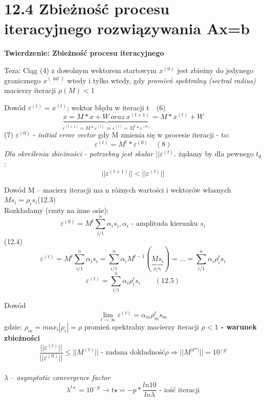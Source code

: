 \section{12.4 Zbieżność procesu iteracyjnego rozwiązywania Ax=b}

\begin{frame}{}
  \textbf{Twierdzenie: Zbieżność procesu iteracyjnego}
  \begin{block}{Teza:}
    \center Ciąg (4) z dowolnym wektorem startowym $x^{(0)}$ jest zbieżny do jedynego granicznego $x^{(\inf)}$ wtedy i tylko wtedy, gdy \emph{promień spektralny (sectral radius)} macierzy iteracji
    \center $\rho(M)<1$
  \end{block}
\end{frame}

\begin{frame}{}
  \begin{block}{Dowód}
    $\varepsilon^{(t)}=x^{(t)}$; wektor błędu w iteracji t$\quad$(6)
    \[\underbrace{x=M*x+W\ oraz\ x^{(t+1)}}_{\varepsilon^{(t+1)}=M*\varepsilon^{(t)} \Rightarrow \varepsilon^{(t)}=M^t*\varepsilon^{(0)}}=M*x^{(t)}+W\]
    (7) $\varepsilon^{(0)}$ - \emph{initial error vector} gdy M zmienia się w procesie iteracji - to:
    \[{\varepsilon}^{(t)}=M^t*{\varepsilon}^{(0)} \quad (8)\]
    \emph{Dla określenia zbieżności - potrzebny jest skalar $||\varepsilon^{(t)}$.}
    żądamy by dla pewnego $t_0$:
    \[||\varepsilon^{(t+1)}||<||\varepsilon^{(t)}||\]
  \end{block}
\end{frame}

\begin{frame}{}
  \begin{block}{Dowód}
    M -- macierz iteracji ma n różnych wartości i wektorów własnych
    \\\hfill$Ms_i=\rho _is_i$\hfill (12.3)
    \\Rozkładamy (rzuty na inne osie):
    \[\varepsilon^{(0)}=M^t \sum_{i/1}^{n} \alpha _i s_i , \alpha _i \text{ - amplituda kierunku } s_i\]
    \hfill\hfill(12.4)
    \[\varepsilon^{(t)}=M^t \sum_{i/1}^{n} \alpha _i s_i = \sum_{i/1}^{n} \alpha _i M^{t-1}(\underbrace{Ms_i}_{\rho _i s_i}) = ... = \sum_{i/1}^{n} \alpha _i \rho _i^t s_i \]
    \[\boxed{\varepsilon^{(t)}=\sum_{i/1}^{n} \alpha _i \rho _i^t s_i} \qquad (12.5)\]
  \end{block}
\end{frame}

\begin{frame}{}
  \begin{block}{Dowód}
    \[\lim_{t\to\infty} \varepsilon^{(t)} = \alpha _m \rho _m^t s_m\]
    gdzie: $\rho _m = max_i |\rho _i|= \rho$ promień spektralny macierzy iteracji
    \center \textbf{$\rho < 1$ - warunek zbieżności}
    $$ \frac{||\varepsilon^{(t)}||}{||\varepsilon^{(0)}||} \leq ||M^{(t)}|| \text{ - zadana dokładność} \rho\Rightarrow ||M^{)t*)}|| = 10^{-p}$$
    \\$\lambda$ -- \emph{asymptotic convergence factor}
    \[\lambda^{t\star}=10^{-p} \rightarrow t\star = -p* \frac{ln 10}{ln \lambda} \text{ - iość iteracji}\]
  \end{block}
\end{frame}
